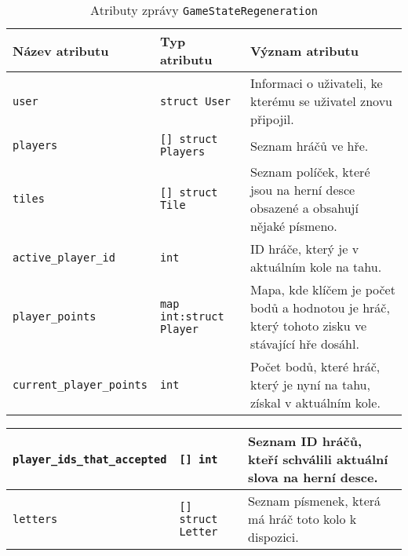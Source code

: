 \documentclass[12pt, a4paper]{article}
\begin{document}
\begin{center}
		\begin{table}[!ht]
		     \caption{Atributy zprávy \texttt{GameStateRegeneration}}
		\begin{tabularx}{\textwidth}{|l|l|X|}
			\hline
			\textbf{Název atributu} & \textbf{Typ atributu} & \textbf{Význam atributu} \\ 
			\hline
			\texttt{user}          &\texttt{struct User}&Informaci o uživateli, ke kterému se uživatel znovu připojil.\\
			\hline
			\texttt{players}          &\texttt{[] struct Players}&Seznam hráčů ve hře.\\
			\hline
			\texttt{tiles}          &\texttt{[] struct Tile}&Seznam políček, které jsou na herní desce obsazené a obsahují nějaké písmeno.\\
			\hline
			\texttt{active\_player\_id}          &\texttt{int}&ID hráče, který je v aktuálním kole na tahu.\\
			\hline
			\texttt{player\_points}          &\texttt{map int:struct Player}&Mapa, kde klíčem je počet bodů a hodnotou je hráč, který tohoto zisku ve stávající hře dosáhl.\\
			\hline
			\texttt{current\_player\_points}          &\texttt{int}&Počet bodů, které hráč, který je nyní na tahu, získal v aktuálním kole.\\
			\hline
		\end{tabularx}
		\end{table}
\end{center} 


\begin{center}
		\begin{table}[!ht]
		\begin{tabularx}{\textwidth}{|l|l|X|}
			\hline
			\texttt{player\_ids\_that\_accepted}          &\texttt{[] int}&Seznam ID hráčů, kteří schválili aktuální slova na herní desce.\\
			\hline
			\texttt{letters}          &\texttt{[] struct Letter}&Seznam písmenek, která má hráč toto kolo k dispozici.\\
			\hline
		\end{tabularx}
		\end{table}
\end{center} 
\end{document}
